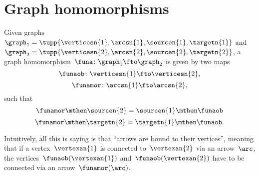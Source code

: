 
\section{Graph homomorphisms}
\begin{definition}
    \label{def:graph_homom}
    Given graphs~$\graph_1=\tupp{\verticesn{1},\arcsn{1},\sourcen{1},\targetn{1}}$ and~$\graph_2=\tupp{\verticesn{2},\arcsn{2},\sourcen{2},\targetn{2}}$, a graph homomorphism~$\funa \colon \graph_1 \fto \graph_2$ is given by two maps~
    \begin{equation}
        \funaob\colon \verticesn{1} \fto \verticesn{2},
    \end{equation}
    \begin{equation}
        \funamor\colon \arcsn{1} \fto \arcsn{2},
    \end{equation} 
        such that
    \begin{equation}
        \funamor \mthen \sourcen{2} = \sourcen{1}\mthen \funaob
    \end{equation}
    \begin{equation}
        \funamor \mthen \targetn{2} = \targetn{1}\mthen \funaob.
    \end{equation}
\end{definition}

\begin{remark}
    Intuitively, all this is saying is that ``arrows are bound to their vertices'', meaning that if a vertex~$\vertexan{1}$ is connected to~$\vertexan{2}$ via an arrow~$\arc$, the vertices~$\funaob(\vertexan{1})$ and~$\funaob(\vertexan{2})$ have to be connected via an arrow~$\funamor(\arc)$.
\end{remark}


